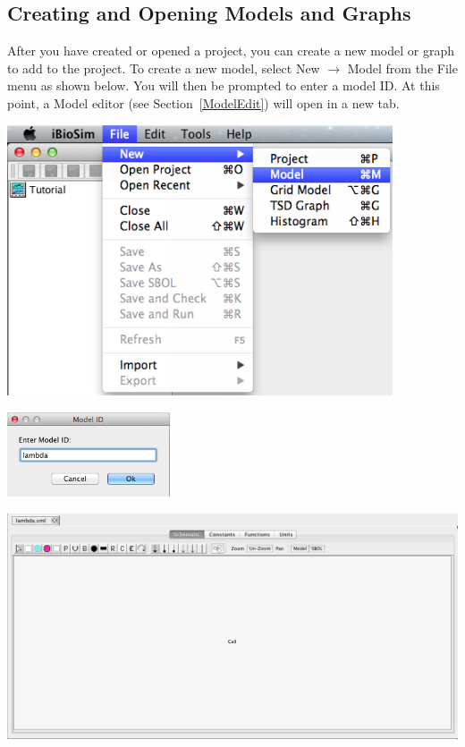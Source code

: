 \documentclass[titlepage,11pt]{article}
\begin{document}
\clearpage

\subsection{Creating and Opening Models and Graphs}

\noindent
After you have created or opened a project, you can create a new model or graph to add to the project.  To create a new model, select New $\rightarrow$ Model from the File menu as shown below. You will then be prompted to enter a model ID.  At this point, a Model editor (see Section~\ref{ModelEdit}) will open in a new tab.  

\begin{center}
\includegraphics[height=80mm]{screenshots/newModel}
\end{center}

\begin{center}
\includegraphics[height=25mm]{screenshots/ModelId}
\end{center}

\begin{center}
\includegraphics[width=160mm]{screenshots/ModelEditor}
\end{center}
\end{document}
